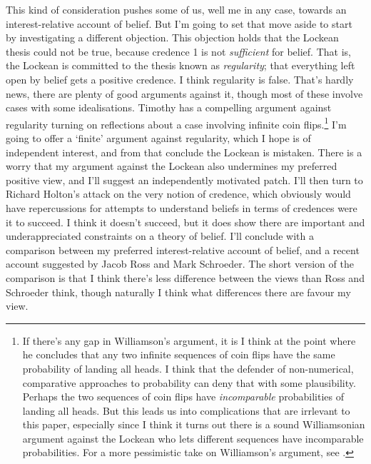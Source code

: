 This kind of consideration pushes some of us, well me in any case, towards an interest-relative account of belief. But I'm going to set that move aside to start by investigating a different objection. This objection holds that the Lockean thesis could not be true, because credence 1 is not \textit{sufficient} for belief. That is, the Lockean is committed to the thesis known as \textit{regularity}; that everything left open by belief gets a positive credence. I think regularity is false. That's hardly news, there are plenty of good arguments against it, though most of these involve cases with some idealisations. Timothy \cite{Williamson2007-WILHPI} has a compelling argument against regularity turning on reflections about a case involving infinite coin flips.\footnote{If there's any gap in Williamson's argument, it is I think at the point where he concludes that any two infinite sequences of coin flips have the same probability of landing all heads. I think that the defender of non-numerical, comparative approaches to probability can deny that with some plausibility. Perhaps the two sequences of coin flips have \textit{incomparable} probabilities of landing all heads. But this leads us into complications that are irrlevant to this paper, especially since I think it turns out there is a sound Williamsonian argument against the Lockean who lets different sequences have incomparable probabilities. For a more pessimistic take on Williamson's argument, see \cite{Weintraub2008}.} I'm going to offer a `finite' argument against regularity, which I hope is of independent interest, and from that conclude the Lockean is mistaken. There is a worry that my argument against the Lockean also undermines my preferred positive view, and I'll suggest an independently motivated patch. I'll then turn to Richard Holton's attack on the very notion of credence, which obviously would have repercussions for attempts to understand beliefs in terms of credences were it to succeed. I think it doesn't succeed, but it does show there are important and underappreciated constraints on a theory of belief. I'll conclude with a comparison between my preferred interest-relative account of belief, and a recent account suggested by Jacob Ross and Mark Schroeder. The short version of the comparison is that I think there's less difference between the views than Ross and Schroeder think, though naturally I think what differences there are favour my view.


